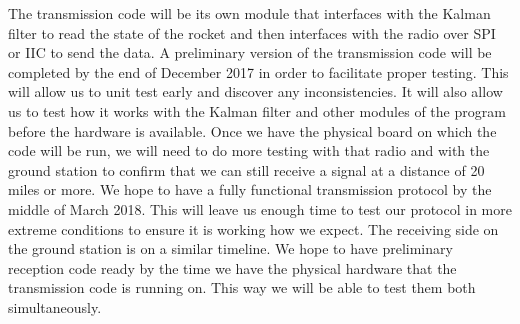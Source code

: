 \documentclass[onecolumn, draftclsnofoot,10pt, compsoc]{IEEEtran}
\begin{document}
The transmission code will be its own module that interfaces with the
Kalman filter to read the state of the rocket and then interfaces with
the radio over SPI or IIC to send the data.
A preliminary version of the transmission code will be completed by
the end of December 2017 in order to facilitate proper testing.
This will allow us to unit test early and discover any inconsistencies.
It will also allow us to test how it works with the Kalman filter and
other modules of the program before the hardware is available.
Once we have the physical board on which the code will be run, we will
need to do more testing with that radio and with the ground station to
confirm that we can still receive a signal at a distance of 20 miles
or more.
We hope to have a fully functional transmission protocol by the middle
of March 2018.
This will leave us enough time to test our protocol in more extreme
conditions to ensure it is working how we expect.
The receiving side on the ground station is on a similar timeline.
We hope to have preliminary reception code ready by the time we have
the physical hardware that the transmission code is running on.
This way we will be able to test them both simultaneously.
\end{document}
